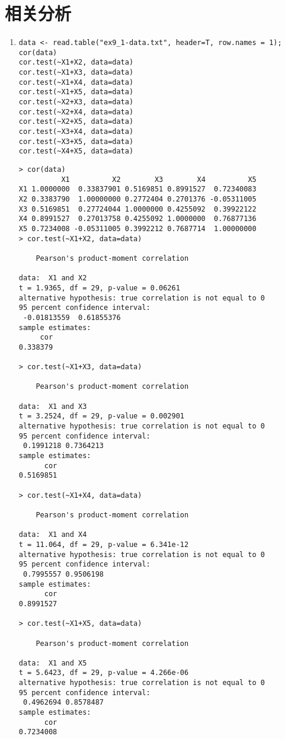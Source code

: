 \section{相关分析}
\begin{enumerate}
    \item
    \code
\begin{lstlisting}
data <- read.table("ex9_1-data.txt", header=T, row.names = 1);
cor(data)
cor.test(~X1+X2, data=data)
cor.test(~X1+X3, data=data)
cor.test(~X1+X4, data=data)
cor.test(~X1+X5, data=data)
cor.test(~X2+X3, data=data)
cor.test(~X2+X4, data=data)
cor.test(~X2+X5, data=data)
cor.test(~X3+X4, data=data)
cor.test(~X3+X5, data=data)
cor.test(~X4+X5, data=data)
\end{lstlisting}
    \out
\begin{lstlisting}
> cor(data)
          X1          X2        X3        X4          X5
X1 1.0000000  0.33837901 0.5169851 0.8991527  0.72340083
X2 0.3383790  1.00000000 0.2772404 0.2701376 -0.05311005
X3 0.5169851  0.27724044 1.0000000 0.4255092  0.39922122
X4 0.8991527  0.27013758 0.4255092 1.0000000  0.76877136
X5 0.7234008 -0.05311005 0.3992212 0.7687714  1.00000000
> cor.test(~X1+X2, data=data)

	Pearson's product-moment correlation

data:  X1 and X2
t = 1.9365, df = 29, p-value = 0.06261
alternative hypothesis: true correlation is not equal to 0
95 percent confidence interval:
 -0.01813559  0.61855376
sample estimates:
     cor 
0.338379 

> cor.test(~X1+X3, data=data)

	Pearson's product-moment correlation

data:  X1 and X3
t = 3.2524, df = 29, p-value = 0.002901
alternative hypothesis: true correlation is not equal to 0
95 percent confidence interval:
 0.1991218 0.7364213
sample estimates:
      cor 
0.5169851 

> cor.test(~X1+X4, data=data)

	Pearson's product-moment correlation

data:  X1 and X4
t = 11.064, df = 29, p-value = 6.341e-12
alternative hypothesis: true correlation is not equal to 0
95 percent confidence interval:
 0.7995557 0.9506198
sample estimates:
      cor 
0.8991527 

> cor.test(~X1+X5, data=data)

	Pearson's product-moment correlation

data:  X1 and X5
t = 5.6423, df = 29, p-value = 4.266e-06
alternative hypothesis: true correlation is not equal to 0
95 percent confidence interval:
 0.4962694 0.8578487
sample estimates:
      cor 
0.7234008 


\end{lstlisting}
\end{enumerate}
